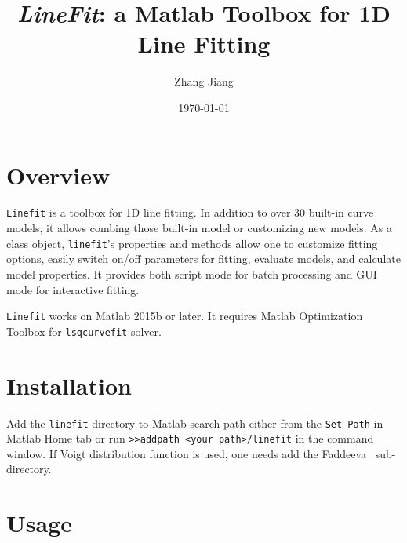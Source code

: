 \documentclass[reprint,showpacs,prb,nofootinbib,amsmath,amssymb]{revtex4-1}
\begin{document}
\title{\textit{LineFit}: a Matlab Toolbox for 1D Line Fitting}
\author{Zhang Jiang}
\date{\today}
\maketitle
\tableofcontents

\section{Overview}

\verb|Linefit| is a toolbox for 1D line  fitting. In addition to over 30 built-in curve models, it allows combing those built-in model or customizing new models. As a class object, \verb|linefit|'s properties and methods allow one to customize fitting options, easily switch on/off parameters for fitting, evaluate models, and calculate model properties. It provides both script mode for batch processing and GUI mode for interactive fitting. 

\verb|Linefit| works on Matlab 2015b or later. It requires Matlab Optimization Toolbox for \verb|lsqcurvefit| solver. 

\section{Installation}

Add the \verb|linefit| directory to Matlab search path either from the \verb|Set Path| in Matlab Home tab or run \verb|>>addpath <your path>/linefit| in the command window. If Voigt distribution function is used, one needs add the Faddeeva~\cite{Faddeeva} sub-directory. 
	
\section{Usage}
\end{document}
